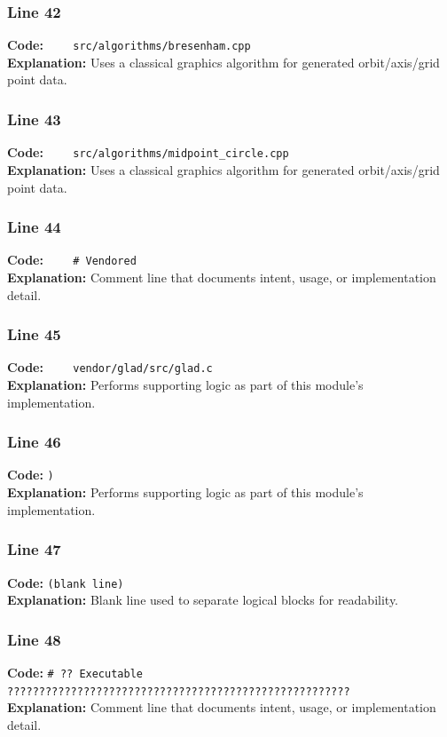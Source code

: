 \documentclass[11pt,a4paper]{article}
\begin{document}
\subsubsection*{Line 42}
\textbf{Code:} \verb|    src/algorithms/bresenham.cpp|\\
\textbf{Explanation:} Uses a classical graphics algorithm for generated orbit/axis/grid point data.

\subsubsection*{Line 43}
\textbf{Code:} \verb|    src/algorithms/midpoint_circle.cpp|\\
\textbf{Explanation:} Uses a classical graphics algorithm for generated orbit/axis/grid point data.

\subsubsection*{Line 44}
\textbf{Code:} \verb|    # Vendored|\\
\textbf{Explanation:} Comment line that documents intent, usage, or implementation detail.

\subsubsection*{Line 45}
\textbf{Code:} \verb|    vendor/glad/src/glad.c|\\
\textbf{Explanation:} Performs supporting logic as part of this module's implementation.

\subsubsection*{Line 46}
\textbf{Code:} \verb|)|\\
\textbf{Explanation:} Performs supporting logic as part of this module's implementation.

\subsubsection*{Line 47}
\textbf{Code:} \texttt{(blank line)}\\
\textbf{Explanation:} Blank line used to separate logical blocks for readability.

\subsubsection*{Line 48}
\textbf{Code:} \verb|# ?? Executable ??????????????????????????????????????????????????????|\\
\textbf{Explanation:} Comment line that documents intent, usage, or implementation detail.
\end{document}
